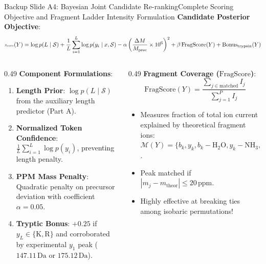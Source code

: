 \documentclass[aspectratio=169, 10pt]{beamer}
\begin{document}
\begin{frame}{Backup Slide A4: Bayesian Joint Candidate Re-ranking}{Complete Scoring Objective and Fragment Ladder Intensity Formulation}
\scriptsize
\textbf{Candidate Posterior Objective}:
\begin{equation*}
  \text{\tiny Score}(Y) = \log p(L \mid \mathcal{S}) + \frac{1}{L} \sum_{i=1}^L \log p(y_i \mid x, \mathcal{S}) - \alpha \left( \frac{\Delta M}{M_{\text{prec}}} \times 10^6 \right)^2 + \beta \, \text{FragScore}(Y) + \text{Bonus}_{\text{trypsin}}(Y)
\end{equation*}

\begin{columns}[T]
\begin{column}{0.49\textwidth}
  \textbf{\footnotesize Component Formulations}:
  \begin{enumerate}\setlength{\itemsep}{1pt}\tiny
    \item \textbf{Length Prior}: $\log p(L \mid \mathcal{S})$ from the auxiliary length predictor (Part A).
    \item \textbf{Normalized Token Confidence}: $\frac{1}{L} \sum_{i=1}^L \log p(y_i)$, preventing length penalty.
    \item \textbf{PPM Mass Penalty}: Quadratic penalty on precursor deviation with coefficient $\alpha = 0.05$.
    \item \textbf{Tryptic Bonus}: $+0.25$ if $y_L \in \{\text{K}, \text{R}\}$ and corroborated by experimental $y_1$ peak ($147.11\,\text{Da}$ or $175.12\,\text{Da}$).
  \end{enumerate}
\end{column}

\begin{column}{0.49\textwidth}
  \textbf{\footnotesize Fragment Coverage ($\text{FragScore}$)}:
  \begin{equation*}
    \text{FragScore}(Y) = \frac{\sum_{j \in \text{matched}} I_j}{\sum_{j=1}^P I_j}
  \end{equation*}
  \begin{itemize}\setlength{\itemsep}{1pt}\tiny
    \item Measures fraction of total ion current explained by theoretical fragment ions:
    $\mathcal{M}(Y) = \{b_k, y_k, b_k - \text{H}_2\text{O}, y_k - \text{NH}_3, b_k^{2+}, y_k^{2+}\}$.
    \item Peak matched if $|m_j - m_{\text{theor}}| \le 20\,\text{ppm}$.
    \item Highly effective at breaking ties among isobaric permutations!
  \end{itemize}
\end{column}
\end{columns}
\end{frame}
\end{document}
